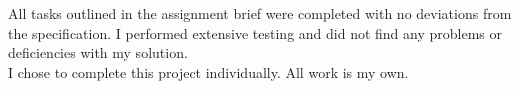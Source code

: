 All tasks outlined in the assignment brief were completed with no deviations from the specification. I performed extensive testing and did not find any problems or deficiencies with my solution. 
\\
I chose to complete this project individually. All work is my own.
